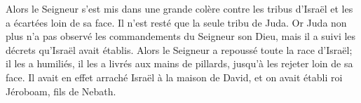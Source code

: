 Alors le Seigneur s’est mis dans une grande colère contre les tribus d’Israël
	et les a écartées loin de sa face.
	Il n’est resté que la seule tribu de Juda.
Or Juda non plus n’a pas observé les commandements du Seigneur son Dieu,
	mais il a suivi les décrets qu’Israël avait établis.
Alors le Seigneur a repoussé toute la race d’Israël;
	il les a humiliés, il les a livrés aux mains de pillards,
	jusqu’à les rejeter loin de sa face.
Il avait en effet arraché Israël à la maison de David,
	et on avait établi roi Jéroboam, fils de Nebath.
